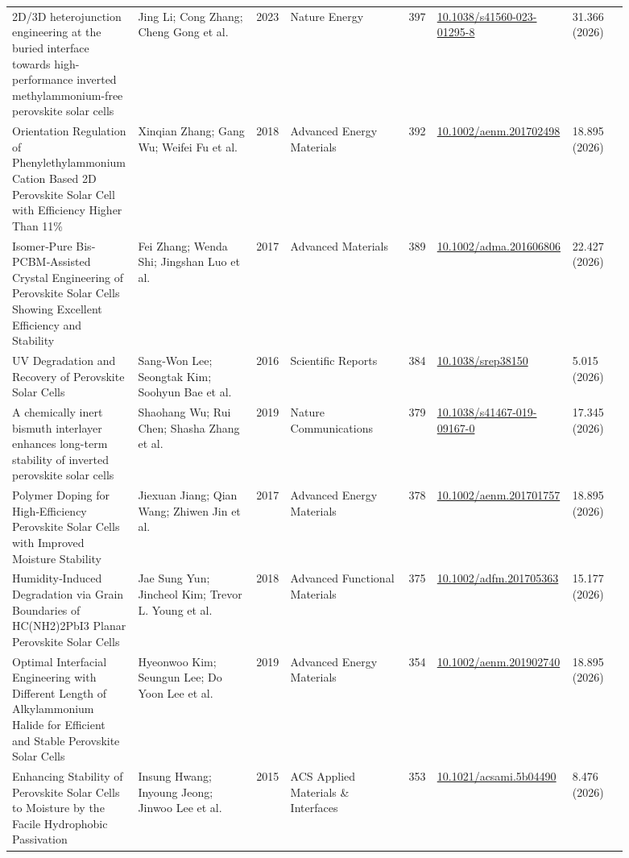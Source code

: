 \documentclass[10pt,a4paper]{article}
\begin{document}
{\begin{longtable}{p{0.197\linewidth}p{0.197\linewidth}p{0.043\linewidth}p{0.197\linewidth}p{0.043\linewidth}p{0.117\linewidth}p{0.098\linewidth}}
2D/3D heterojunction engineering at the buried interface towards high-performance inverted methylammonium-free perovskite solar cells & Jing Li; Cong Zhang; Cheng Gong et al. & 2023 & Nature Energy & 397 & \href{https://doi.org/10.1038/s41560-023-01295-8}{10.1038/s41560-023-01295-8} & 31.366 (2026) \\
Orientation Regulation of Phenylethylammonium Cation Based 2D Perovskite Solar Cell with Efficiency Higher Than 11\% & Xinqian Zhang; Gang Wu; Weifei Fu et al. & 2018 & Advanced Energy Materials & 392 & \href{https://doi.org/10.1002/aenm.201702498}{10.1002/aenm.201702498} & 18.895 (2026) \\
Isomer‐Pure Bis‐PCBM‐Assisted Crystal Engineering of Perovskite Solar Cells Showing Excellent Efficiency and Stability & Fei Zhang; Wenda Shi; Jingshan Luo et al. & 2017 & Advanced Materials & 389 & \href{https://doi.org/10.1002/adma.201606806}{10.1002/adma.201606806} & 22.427 (2026) \\
UV Degradation and Recovery of Perovskite Solar Cells & Sang‐Won Lee; Seongtak Kim; Soohyun Bae et al. & 2016 & Scientific Reports & 384 & \href{https://doi.org/10.1038/srep38150}{10.1038/srep38150} & 5.015 (2026) \\
A chemically inert bismuth interlayer enhances long-term stability of inverted perovskite solar cells & Shaohang Wu; Rui Chen; Shasha Zhang et al. & 2019 & Nature Communications & 379 & \href{https://doi.org/10.1038/s41467-019-09167-0}{10.1038/s41467-019-09167-0} & 17.345 (2026) \\
Polymer Doping for High‐Efficiency Perovskite Solar Cells with Improved Moisture Stability & Jiexuan Jiang; Qian Wang; Zhiwen Jin et al. & 2017 & Advanced Energy Materials & 378 & \href{https://doi.org/10.1002/aenm.201701757}{10.1002/aenm.201701757} & 18.895 (2026) \\
Humidity‐Induced Degradation via Grain Boundaries of HC(NH2)2PbI3 Planar Perovskite Solar Cells & Jae Sung Yun; Jincheol Kim; Trevor L. Young et al. & 2018 & Advanced Functional Materials & 375 & \href{https://doi.org/10.1002/adfm.201705363}{10.1002/adfm.201705363} & 15.177 (2026) \\
Optimal Interfacial Engineering with Different Length of Alkylammonium Halide for Efficient and Stable Perovskite Solar Cells & Hyeonwoo Kim; Seungun Lee; Do Yoon Lee et al. & 2019 & Advanced Energy Materials & 354 & \href{https://doi.org/10.1002/aenm.201902740}{10.1002/aenm.201902740} & 18.895 (2026) \\
Enhancing Stability of Perovskite Solar Cells to Moisture by the Facile Hydrophobic Passivation & Insung Hwang; Inyoung Jeong; Jinwoo Lee et al. & 2015 & ACS Applied Materials \& Interfaces & 353 & \href{https://doi.org/10.1021/acsami.5b04490}{10.1021/acsami.5b04490} & 8.476 (2026) \\

\end{longtable}}
\end{document}

